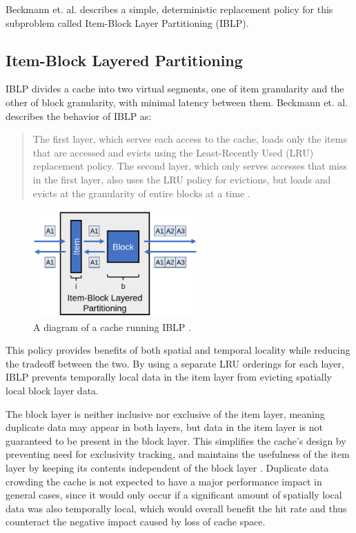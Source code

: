 \documentclass[12pt,twoside]{reedthesis}
\begin{document}
Beckmann et. al. describes a simple, deterministic replacement policy for this subproblem called Item-Block Layer Partitioning (IBLP).

	\subsection*{Item-Block Layered Partitioning}

	IBLP divides a cache into two virtual segments, one of item granularity and the other of block granularity, with minimal latency between them. Beckmann et. al. describes the behavior of IBLP as: \begin{quote}
		The first layer, which serves each access to the cache, loads only the items that are accessed and evicts using the Least-Recently Used (LRU) replacement policy. The second layer, which only serves accesses that miss in the first layer, also uses the LRU policy for evictions, but loads and evicts at the granularity of entire blocks at a time \cite{beckmann}.
	\end{quote}

	\begin{figure}[h]
		\centering
		\includegraphics[width=2.5in]{figures/IBLP.png}
		\caption{A diagram of a cache running IBLP \cite{beckmann}.}
	\end{figure}

	This policy provides benefits of both spatial and temporal locality while reducing the tradeoff between the two. By using a separate LRU orderings for each layer, IBLP prevents temporally local data in the item layer from evicting spatially local block layer data.
	
	The block layer is neither inclusive nor exclusive of the item layer, meaning duplicate data may appear in both layers, but data in the item layer is not guaranteed to be present in the block layer. This simplifies the cache's design by preventing need for exclusivity tracking, and maintains the usefulness of the item layer by keeping its contents independent of the block layer \cite{beckmann}. Duplicate data crowding the cache is not expected to have a major performance impact in general cases, since it would only occur if a significant amount of spatially local data was also temporally local, which would overall benefit the hit rate and thus counteract the negative impact caused by loss of cache space.
	
\end{document}
